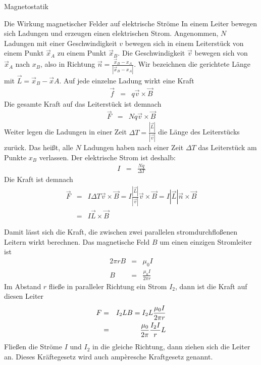 \begin{chapter}{\titlestr}
\begin{section}{Magnetostatik}
\begin{subsection}{Die Wirkung magnetischer Felder auf elektrische Ströme}
In einem Leiter bewegen sich Ladungen und erzeugen einen elektrischen Strom. Angenommen, $N$ Ladungen mit einer Geschwindigkeit $v$ bewegen sich in einem Leiterstück von einem Punkt $\vec{x}_A$ zu einem Punkt $\vec{x}_B$.
Die Geschwindigkeit $\vec{v}$ bewegen sich von $\vec{x}_A$ nach ${x}_B$, also in Richtung $\vec{n}=\frac{\vec{x}_B-{x}_A}{|\vec{x}_B-{x}_A|}$. Wir bezeichnen die gerichtete Länge mit $\vec{L}=\vec{x}_B-\vec{x}A$.
Auf jede einzelne Ladung wirkt eine Kraft
\begin{eqnarray*}
\vec{f} &=& q\vec{v}\times \vec{B}
\end{eqnarray*}
Die gesamte Kraft auf das Leiterstück ist demnach
\begin{eqnarray*}
\vec{F} &=& Nq\vec{v}\times \vec{B}
\end{eqnarray*}
Weiter legen die Ladungen in einer Zeit $\Delta T=\frac{|\vec{L}|}{|\vec{v}|}$ die Länge des Leiterstücks zurück. Das heißt, alle $N$ Ladungen haben nach einer Zeit $\Delta T$ das Leiterstück am Punkte $x_B$ verlassen.
Der elektrische Strom ist deshalb:
\begin{eqnarray*}
I &=& \frac{Nq}{\Delta T}
\end{eqnarray*}
Die Kraft ist demnach
\begin{eqnarray*}
\vec{F} &=& I\Delta T\vec{v}\times \vec{B}=I\frac{|\vec{L}|}{|\vec{v}|}\vec{v}\times \vec{B}=I|\vec{L}|\vec{n}\times \vec{B}\\
&=&I\vec{L}\times \vec{B}
\end{eqnarray*}

Damit lässt sich die Kraft, die zwischen zwei parallelen stromdurchfloßenen Leitern wirkt berechnen. Das magnetische Feld $B$ um einen einzigen Stromleiter ist
\begin{eqnarray*}
2\pi r B &=& \mu_0 I\\
B &=& \frac{\mu_0 I}{2\pi r}
\end{eqnarray*}
Im Abstand $r$ fließe in paralleler Richtung ein Strom $I_2$, dann ist die Kraft auf diesen Leiter
\begin{eqnarray}
\label{parallel_currents}
F &=& I_2LB= I_2L\frac{\mu_0 I}{2\pi r}\cr
&=& \frac{\mu_0}{2\pi}\frac{I_2I}{r}L
\end{eqnarray}
Fließen die Ströme $I$ und $I_2$ in die gleiche Richtung, dann ziehen sich die Leiter an.
Dieses Kräftegesetz wird auch ampèresche Kraftgesetz genannt.
\end{subsection}


\end{section}
\end{chapter}
